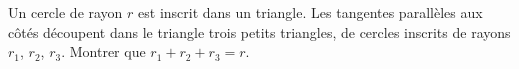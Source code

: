 Un cercle de rayon $r$ est inscrit dans un triangle. Les tangentes parallèles aux côtés découpent dans le triangle trois petits triangles, de cercles inscrits de rayons $r_1$, $r_2$, $r_3$. Montrer que $r_1 + r_2 + r_3 = r$.
